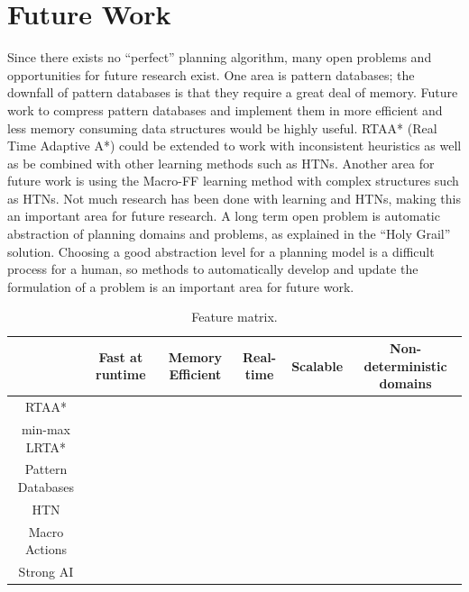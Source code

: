 \documentclass[tog]{acmsiggraph}
\newcommand{\cmark}{\color{Green}{\ding{51}}}
\newcommand{\xmark}{\color{Red}{\ding{55}}}
\begin{document}
\section{Future Work}
Since there exists no ``perfect'' planning algorithm, many open problems
and opportunities for future research exist. One area is pattern
databases; the downfall of pattern databases is that they require a
great deal of memory. Future work to compress pattern databases and
implement them in more efficient and less memory consuming data
structures would be highly useful. RTAA* (Real Time Adaptive A*) could
be extended to work with inconsistent heuristics as well as be
combined with other learning methods such as HTNs. Another area for
future work is using the Macro-FF learning method with complex
structures such as HTNs. Not much research has been done with learning
and HTNs, making this an important area for future research. A long
term open problem is automatic abstraction of planning domains and
problems, as explained in the ``Holy Grail'' solution. Choosing a good
abstraction level for a planning model is a difficult process for a
human, so methods to automatically develop and update the formulation
of a problem is an important area for future work.

\begin{table}
  \centering
  \begin{tabular}{*{6}{c}}
    \toprule
    & Fast at runtime & Memory Efficient & Real-time & Scalable & Non-deterministic domains \\
    \midrule
    RTAA* & \cmark{} & \cmark{} & \cmark{} & \xmark{}  & \cmark{} \\
    \midrule
    min-max LRTA* & \cmark{} & \cmark{} & \cmark{} & \xmark{}  & \cmark{} \\
    \midrule
    Pattern Databases & \cmark{} & \xmark{} & \xmark{} & \cmark{} & \xmark{} \\
    \midrule
    HTN   & \xmark{} & \cmark{} & \xmark{} & \cmark{} & \xmark{} \\
    \midrule
    Macro Actions & \cmark{} & \cmark{} & \xmark{} & \cmark{} & \xmark{} \\
    \midrule
    Strong AI & \cmark{} & \cmark{} & \cmark{} & \cmark{} & \cmark{} \\
    \bottomrule
  \end{tabular}
  \caption{Feature matrix.}
  \label{table:feature_matrix}
\end{table}
\end{document}
